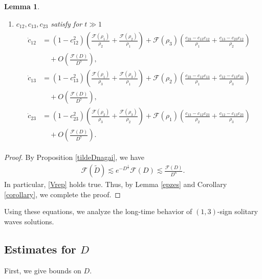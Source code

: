 \documentclass[reqno]{amsart}
\theoremstyle{plain}
\newtheorem{lemma}[theorem]{Lemma}
\theoremstyle{definition}
\numberwithin{equation}{section}
\newcommand{\1}{\mathbbm{1}}
\begin{document}
\begin{lemma}
\begin{enumerate}
\item $c_{12},c_{13},c_{23}$ satisfy for $t\gg 1$
\begin{align}\label{cesver2}
\begin{aligned}
\dot{c}_{12}&=(1-c_{12}^2)\left(\frac{\mathcal{F}(\rho_1)}{\rho_2}+\frac{\mathcal{F}(\rho_2)}{\rho_1}\right)+\mathcal{F}(\rho_3)\left( \frac{c_{23}-c_{13}c_{12}}{\rho_1}+\frac{c_{13}-c_{23}c_{12}}{\rho_2}\right)
\\
&\quad+O\left(\frac{\mathcal{F}(D)}{D^7}\right),
\\
\dot{c}_{13}&=(1-c_{13}^2)\left(\frac{\mathcal{F}(\rho_1)}{\rho_3}+\frac{\mathcal{F}(\rho_3)}{\rho_1}\right)+\mathcal{F}(\rho_2)\left( \frac{c_{23}-c_{12}c_{13}}{\rho_1}+\frac{c_{12}-c_{13}c_{23}}{\rho_3}\right)
\\
&\quad+O\left(\frac{\mathcal{F}(D)}{D^7}\right),
\\
\dot{c}_{23}&=(1-c_{23}^2)\left(\frac{\mathcal{F}(\rho_2)}{\rho_3}+\frac{\mathcal{F}(\rho_3)}{\rho_2}\right)+\mathcal{F}(\rho_1)\left( \frac{c_{13}-c_{12}c_{23}}{\rho_2}+\frac{c_{12}-c_{13}c_{23}}{\rho_3}\right)
\\
&\quad+O\left(\frac{\mathcal{F}(D)}{D^7}\right).
\end{aligned}
\end{align}
\end{enumerate}
\end{lemma}
\begin{proof}
By Proposition \ref{tildeDnagai}, we have
\begin{align*}
\mathcal{F}(\tilde{D})\lesssim e^{-D^{\frac{1}{5}}}\mathcal{F}(D)\lesssim \frac{\mathcal{F}(D)}{D^6}.
\end{align*}
In particular, \eqref{Vrep} holds true. Thus, by Lemma \ref{epzes} and Corollary \ref{corollary}, we complete the proof.
\end{proof}
Using these equations, we analyze the long-time behavior of $(1,3)$-sign solitary waves solutions.

\subsection{Estimates for $D$}

First, we give bounds on $D$.
\end{document}
